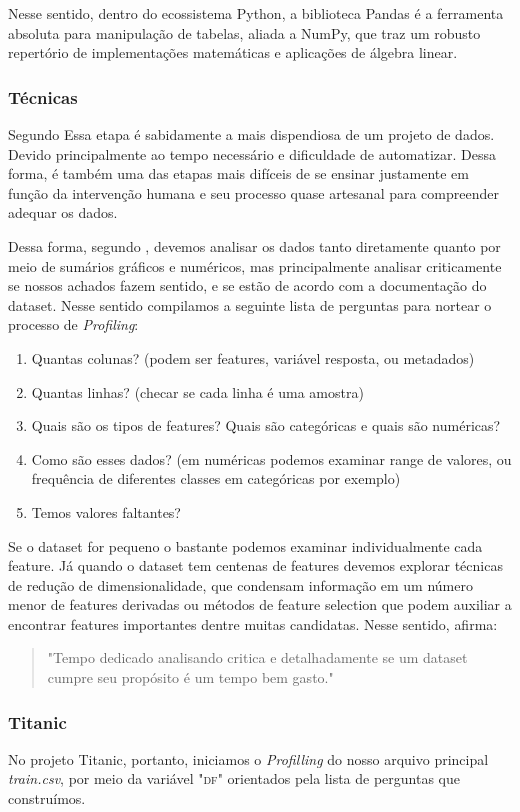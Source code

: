 Nesse sentido, dentro do ecossistema Python, a biblioteca Pandas é a ferramenta absoluta para manipulação de tabelas, aliada a NumPy, que traz um robusto repertório de implementações matemáticas e aplicações de álgebra linear.\cite{PRINCIPLES}

\subsubsection{Técnicas}
Segundo \cite{BATON,DONOHO,DATAPYTHON} Essa etapa é sabidamente a mais dispendiosa de um projeto de dados. Devido principalmente ao tempo necessário e dificuldade de automatizar. Dessa forma, é também uma das etapas mais difíceis de se ensinar justamente em função da intervenção humana e seu processo quase artesanal para compreender adequar os dados. 

Dessa forma, segundo \cite{DATAPYTHON}, devemos analisar os dados tanto diretamente quanto por meio de sumários gráficos e numéricos, mas principalmente analisar criticamente se nossos achados fazem sentido, e se estão de acordo com a documentação do dataset. Nesse sentido compilamos a seguinte lista de perguntas para nortear o processo de \emph{Profiling}:
\begin{enumerate}
\item Quantas colunas? (podem ser features, variável resposta, ou metadados)
\item Quantas linhas? (checar se cada linha é uma amostra)
\item Quais são os tipos de features? Quais são categóricas e quais são numéricas? 
\item Como são esses dados? (em numéricas podemos examinar range de valores, ou frequência de diferentes classes em categóricas por exemplo)
\item Temos valores faltantes? 
\end{enumerate}
Se o dataset for pequeno o bastante podemos examinar individualmente cada feature. Já quando o dataset tem centenas de features devemos explorar técnicas de redução de dimensionalidade, que condensam informação em um número menor de features derivadas ou métodos de feature selection que podem auxiliar a encontrar features importantes dentre muitas candidatas. Nesse sentido, \cite{DATAPYTHON} afirma:
\begin{quote}
    "Tempo dedicado analisando critica e detalhadamente se um dataset cumpre seu propósito é um tempo bem gasto." 
\end{quote}

\subsubsection{Titanic}
No projeto Titanic, portanto, iniciamos o \emph{Profilling} do nosso arquivo principal \emph{train.csv}, por meio da variável "\textsc{df}" orientados pela lista de perguntas que construímos.

